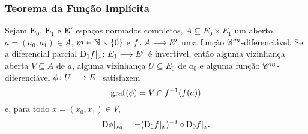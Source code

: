 \subsubsection{Teorema da Função Implícita}

\begin{theorem}
\label{prop:teorema.funcao.implicita}
Sejam $\bm E_0$, $\bm E_1$ e $\bm E'$ espaços normados completos, $A \subseteq E_0 \times E_1$ um aberto, $a = (a_0,a_1) \in A$, $m \in \mathbb{N} \smallsetminus \{0\}$ e  $f\colon \allowbreak A \longrightarrow E'$ uma função $\mathscr{C}^m$-diferenciável. Se a diferencial parcial $\mathrm{D}_1 f|_a\colon \allowbreak E_1 \longrightarrow E'$ é invertível, então alguma vizinhança aberta $V \subseteq A$ de $a$, alguma vizinhança $U \subseteq E_0$ de $a_0$ e alguma função $\mathscr{C}^m$-diferenciável $\phi\colon \allowbreak U \longrightarrow E_1$ satisfazem
	\begin{equation*}
	\operatorname{graf}(\phi) = V \cap f^{-1}(f(a))
	\end{equation*}
e, para todo $x = (x_0,x_1) \in V$,
	\begin{equation*}
	\mathrm{D} \phi|_{x_0} = - (\mathrm{D}_1 f|_x)^{-1} \circ \mathrm{D}_0 f|_x.
	\end{equation*}
\end{theorem}
